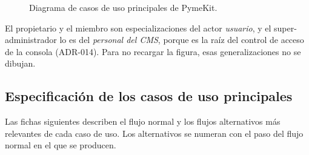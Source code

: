 \begin{figure}[htbp]
{}
  \caption{Diagrama de casos de uso principales de PymeKit.}
  \label{fig:ana-casos-uso}
\end{figure}

El propietario y el miembro son especializaciones del actor \emph{usuario}, y
el super-administrador lo es del \emph{personal del CMS}, porque es la raíz
del control de acceso de la consola (ADR-014). Para no recargar la figura,
esas generalizaciones no se dibujan.

\subsection{Especificación de los casos de uso principales}
\label{sec:ana-fichas}

Las fichas siguientes describen el flujo normal y los flujos alternativos más
relevantes de cada caso de uso. Los alternativos se numeran con el paso del
flujo normal en el que se producen.

